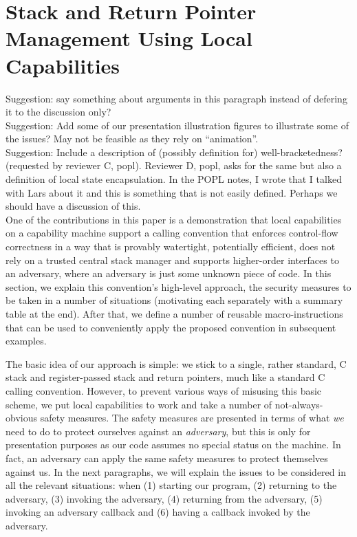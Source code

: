 \documentclass[format=acmsmall, review=false, screen=true]{acmart}
\newcommand{\itoplassug}[1]
    {{\color{Blue} #1}}
\begin{document}
\section{Stack and Return Pointer Management Using Local Capabilities}
\label{sec:stack-and-return-pointer}
\itoplassug{Suggestion: say something about arguments in this paragraph instead of defering it to the discussion only?\\}
\itoplassug{Suggestion: Add some of our presentation illustration figures to illustrate some of the issues? May not be feasible as they rely on ``animation''.\\}
\itoplassug{Suggestion: Include a description of (possibly definition for) well-bracketedness? (requested by reviewer C, popl). Reviewer D, popl, asks for the same but also a definition of local state encapsulation. In the POPL notes, I wrote that I talked with Lars about it and this is something that is not easily defined. Perhaps we should have a discussion of this.\\}
One of the contributions in this paper is a
demonstration that local capabilities on a capability machine support a calling
convention that enforces control-flow correctness in a way that is provably
watertight, potentially efficient, does not rely on a trusted central stack
manager and supports higher-order interfaces to an adversary, where an adversary
is just some unknown piece of code. In this section, we explain this
convention's high-level approach, the security measures to be taken in a number
of situations (motivating each separately with a summary table at the end).
After that, we define a number of reusable macro-instructions that can be used
to conveniently apply the proposed convention in subsequent examples.

The basic idea of our approach is simple: we stick to a single, rather standard,
C stack and register-passed stack and return pointers, much like a standard C
calling convention. However, to prevent various ways of misusing this basic
scheme, we put local capabilities to work and take a number of
not-always-obvious safety measures. The safety measures are presented in terms
of what \emph{we} need to do to protect ourselves against an \emph{adversary},
but this is only for presentation purposes as our code assumes no special status on
the machine. In fact, an adversary can apply the same safety measures to protect
themselves against us. In the next paragraphs, we will explain the issues to be
considered in all the relevant situations: when (1) starting our program, (2)
returning to the adversary, (3) invoking the adversary, (4) returning from the
adversary, (5) invoking an adversary callback and (6) having a callback invoked
by the adversary.
\end{document}

